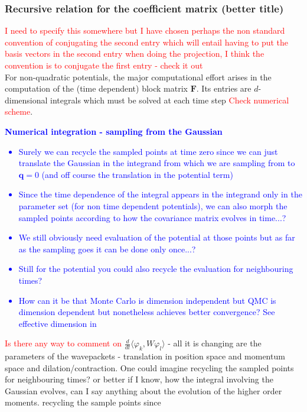 \subsubsection{Recursive relation for the coefficient matrix (better title)}
\textcolor{red}{I need to specify this somewhere but I have chosen perhaps the 
non standard convention of conjugating the second entry which will entail having to 
put the basis vectors in the second entry when doing the projection, I think the convention 
is to conjugate the first entry - check it out}
\\
For non-quadratic potentials, the major computational effort 
arises in the computation of the (time dependent) block matrix $\bm{F}$.
Its entries are $d$-dimensional integrals which must be solved at 
each time step \textcolor{red}{Check numerical scheme}.
\textcolor{blue}{
  \textbf{Numerical integration - sampling from the Gaussian}
\begin{itemize}
  \item Surely we can recycle the sampled points at time 
    zero since we can just translate the Gaussian in the integrand
    from which we are sampling from to $\bm{q} = 0$ (and off course 
    the translation in the potential term)
  \item Since the time dependence of the integral appears in the integrand 
    only in the parameter set (for non time dependent potentials), 
    we can also morph the sampled points according to how the 
    covariance matrix evolves in time...?
  \item We still obviously need evaluation of the potential at those 
    points but as far as the sampling goes it can be done only once...?
  \item Still for the potential you could also recycle the evaluation 
    for neighbouring times?
  \item How can it be that Monte Carlo is dimension independent but QMC 
    is dimension dependent but nonetheless achieves better convergence? 
    See effective dimension in \cite{wangEffectiveDimensionQuasiMonte2003} 
\end{itemize}}
\textcolor{red}{Is there any way to comment 
on} $\frac{d}{dt}\langle \varphi_k, W \varphi_l  \rangle$ - all it is 
changing are the parameters of the wavepackets - translation in position space 
and momentum space and dilation/contraction. One could imagine recycling 
the sampled points for neighbouring times? or better if I know, how the 
integral involving the Gaussian evolves, can I say anything about the 
evolution of the higher order moments. recycling the sample points since 
